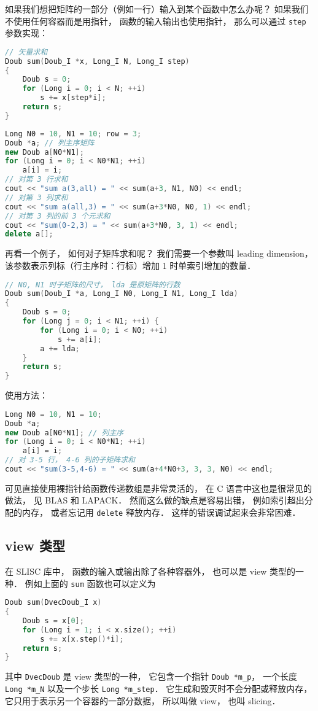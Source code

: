 
\begin{issues}
\issueDraft
\end{issues}


如果我们想把矩阵的一部分（例如一行）输入到某个函数中怎么办呢？ 如果我们不使用任何容器而是用指针， 函数的输入输出也使用指针， 那么可以通过 \verb|step| 参数实现：
\begin{lstlisting}[language=cpp]
// 矢量求和
Doub sum(Doub_I *x, Long_I N, Long_I step)
{
    Doub s = 0;
    for (Long i = 0; i < N; ++i)
        s += x[step*i];
    return s;
}
\end{lstlisting}

\begin{lstlisting}[language=cpp]
Long N0 = 10, N1 = 10; row = 3;
Doub *a; // 列主序矩阵
new Doub a[N0*N1];
for (Long i = 0; i < N0*N1; ++i)
    a[i] = i;
// 对第 3 行求和
cout << "sum a(3,all) = " << sum(a+3, N1, N0) << endl;
// 对第 3 列求和
cout << "sum a(all,3) = " << sum(a+3*N0, N0, 1) << endl;
// 对第 3 列的前 3 个元求和
cout << "sum(0-2,3) = " << sum(a+3*N0, 3, 1) << endl;
delete a[];
\end{lstlisting}
再看一个例子， 如何对子矩阵求和呢？ 我们需要一个参数叫 leading dimension， 该参数表示列标（行主序时：行标）增加 1 时单索引增加的数量．
\begin{lstlisting}[language=cpp]
// N0, N1 时子矩阵的尺寸， lda 是原矩阵的行数
Doub sum(Doub_I *a, Long_I N0, Long_I N1, Long_I lda)
{
    Doub s = 0;
    for (Long j = 0; i < N1; ++i) {
        for (Long i = 0; i < N0; ++i)
            s += a[i];
        a += lda;
    }
    return s;
}
\end{lstlisting}
使用方法：
\begin{lstlisting}[language=cpp]
Long N0 = 10, N1 = 10;
Doub *a;
new Doub a[N0*N1]; // 列主序
for (Long i = 0; i < N0*N1; ++i)
    a[i] = i;
// 对 3-5 行， 4-6 列的子矩阵求和
cout << "sum(3-5,4-6) = " << sum(a+4*N0+3, 3, 3, N0) << endl;
\end{lstlisting}
可见直接使用裸指针给函数传递数组是非常灵活的， 在 C 语言中这也是很常见的做法， 见 BLAS 和 LAPACK． 然而这么做的缺点是容易出错， 例如索引超出分配的内存， 或者忘记用 \verb|delete| 释放内存． 这样的错误调试起来会非常困难．

\subsection{view 类型}
在 SLISC 库中， 函数的输入或输出除了各种容器外， 也可以是 view 类型的一种． 例如上面的 \verb|sum| 函数也可以定义为
\begin{lstlisting}[language=cpp]
Doub sum(DvecDoub_I x)
{
    Doub s = x[0];
    for (Long i = 1; i < x.size(); ++i)
        s += x[x.step()*i];
    return s;
}
\end{lstlisting}
其中 \verb|DvecDoub| 是 view 类型的一种， 它包含一个指针 \verb|Doub *m_p|， 一个长度 \verb|Long *m_N| 以及一个步长 \verb|Long *m_step|． 它生成和毁灭时不会分配或释放内存， 它只用于表示另一个容器的一部分数据， 所以叫做 view， 也叫 slicing．


